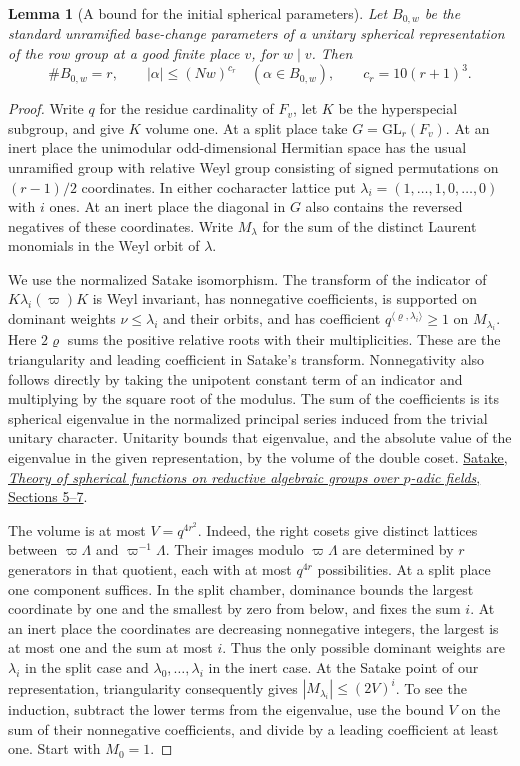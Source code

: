 \documentclass[a4paper,11pt]{article}
\newtheorem{lemma}[proposition]{Lemma}
\theoremstyle{definition}
\theoremstyle{remark}
\numberwithin{equation}{section}
\begin{document}
\begin{lemma}[A bound for the initial spherical parameters]
\label{lem:sat171}
Let \(B_{0,w}\) be the standard unramified base-change parameters
of a unitary spherical representation of the row group at a
good finite place \(v\), for \(w\mid v\). Then
\[
     \# B_{0,w}=r,\qquad
     |\alpha|\le (Nw)^{c_r}\quad(\alpha\in B_{0,w}),\qquad
     c_r=10(r+1)^3 .
\]
\end{lemma}
\begin{proof}
Write \(q\) for the residue cardinality of \(F_v\), let \(K\)
be the hyperspecial subgroup, and give \(K\) volume one.
At a split place take \(G=\mathrm{GL}_r(F_v)\). At an inert
place the unimodular odd-dimensional Hermitian space has the
usual unramified group with relative Weyl group consisting
of signed permutations on \((r-1)/2\) coordinates.
In either cocharacter lattice put
\(\lambda_i=(1,\ldots,1,0,\ldots,0)\) with \(i\) ones.
At an inert place the diagonal in \(G\) also contains the
reversed negatives of these coordinates. Write \(M_\lambda\)
for the sum of the distinct Laurent monomials in the Weyl
orbit of \(\lambda\).

We use the normalized Satake isomorphism. The transform of
the indicator of \(K\lambda_i(\varpi)K\) is Weyl invariant,
has nonnegative coefficients, is supported on dominant
weights \(\nu\le\lambda_i\) and their orbits, and has
coefficient \(q^{\langle\varrho,\lambda_i\rangle}\ge1\)
on \(M_{\lambda_i}\). Here \(2\varrho\) sums the positive
relative roots with their multiplicities. These are the
triangularity and leading coefficient in Satake's transform.
Nonnegativity also follows directly by taking the unipotent
constant term of an indicator and multiplying by the square
root of the modulus. The sum of the coefficients is its
spherical eigenvalue in the normalized principal series
induced from the trivial unitary character. Unitarity bounds
that eigenvalue, and the absolute value of the eigenvalue in
the given representation, by the volume of the double coset.
\href{https://www.numdam.org/item/PMIHES_1963__18__5_0.pdf}{Satake,
\emph{Theory of spherical functions on reductive algebraic
groups over \(p\)-adic fields}, Sections 5--7}.

The volume is at most \(V=q^{4r^2}\). Indeed, the right cosets
give distinct lattices between \(\varpi\Lambda\) and
\(\varpi^{-1}\Lambda\). Their images modulo \(\varpi\Lambda\)
are determined by \(r\) generators in that quotient, each
with at most \(q^{4r}\) possibilities. At a split place one
component suffices. In the split chamber, dominance bounds the
largest coordinate by one and the smallest by zero from below,
and fixes the sum \(i\). At an inert place the coordinates are
decreasing nonnegative integers, the largest is at most one
and the sum at most \(i\). Thus the only possible dominant
weights are \(\lambda_i\) in the split case and
\(\lambda_0,\ldots,\lambda_i\) in the inert case. At the
Satake point of our representation, triangularity consequently
gives \(|M_{\lambda_i}|\le(2V)^i\). To see the induction,
subtract the lower terms from the eigenvalue, use the bound
\(V\) on the sum of their nonnegative coefficients, and divide
by a leading coefficient at least one. Start with \(M_0=1\).


\end{proof}
\end{document}
